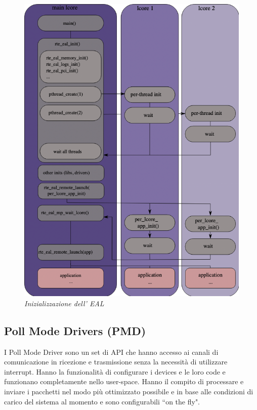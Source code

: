 \begin{figure}[h]
\includegraphics[scale=0.40]{images/EAL.png}
\centering
\caption{\textit{Inizializzazione dell' EAL}}
\label{fig:EAL}
\end{figure}
\FloatBarrier
{}
\subsection*{Poll Mode Drivers (PMD)}
I Poll Mode Driver sono un set di API che hanno accesso ai canali di comunicazione in ricezione e trasmissione senza la necessità di utilizzare interrupt. Hanno la funzionalità di configurare i devices e le loro code e funzionano completamente nello user-space. Hanno il compito di processare e inviare i pacchetti nel modo più ottimizzato possibile e in base alle condizioni di carico del sistema al momento e sono configurabili ``on the fly".

